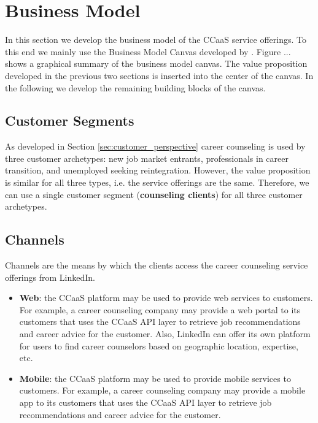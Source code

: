 \section{Business Model}
\label{sec:business_model}

In this section we develop the business model of the CCaaS service offerings. To this end we mainly
use the Business Model Canvas developed by \cite{osterwalderBusinessModelGeneration2010}. Figure ...
shows a graphical summary of the business model canvas. The value proposition developed in the previous
two sections is inserted into the center of the canvas. In the following we develop the remaining building
blocks of the canvas.


\subsection{Customer Segments}

As developed in Section \ref{sec:customer_perspective} career counseling is used by three customer archetypes:
new job market entrants, professionals in career transition, and unemployed seeking reintegration. However, the
value proposition is similar for all three types, i.e. the service offerings are the same. Therefore, we can use
a single customer segment (\textbf{counseling clients}) for all three customer archetypes.


\subsection{Channels}

Channels are the means by which the clients access the career counseling service offerings from LinkedIn.

\begin{itemize}
    \item \textbf{Web}: the CCaaS platform may be used to provide web services to customers.
            For example, a career counseling company may provide a web portal to its customers
            that uses the CCaaS API layer to retrieve job recommendations and career advice for
            the customer. Also, LinkedIn can offer its own platform for users to find career
            counselors based on geographic location, expertise, etc.
    \item \textbf{Mobile}: the CCaaS platform may be used to provide mobile services to customers.
            For example, a career counseling company may provide a mobile app to its customers
            that uses the CCaaS API layer to retrieve job recommendations and career advice for
            the customer.
\end{itemize}


